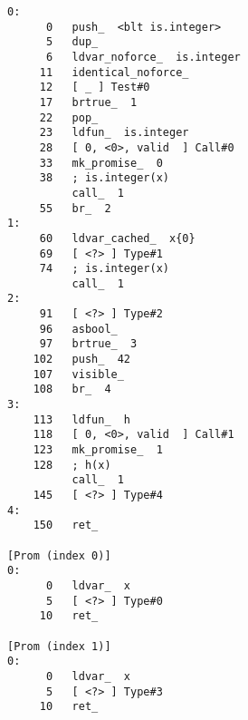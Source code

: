 \documentclass[varwidth=15cm, border={1cm 0.1cm 1cm 1cm}]{standalone}
\begin{document}
\begin{listing}
    \begin{verbatim}
0:
      0   push_  <blt is.integer>
      5   dup_
      6   ldvar_noforce_  is.integer
     11   identical_noforce_
     12   [ _ ] Test#0
     17   brtrue_  1
     22   pop_
     23   ldfun_  is.integer
     28   [ 0, <0>, valid  ] Call#0
     33   mk_promise_  0
     38   ; is.integer(x)
          call_  1
     55   br_  2
1:
     60   ldvar_cached_  x{0}
     69   [ <?> ] Type#1
     74   ; is.integer(x)
          call_  1
2:
     91   [ <?> ] Type#2
     96   asbool_
     97   brtrue_  3
    102   push_  42
    107   visible_
    108   br_  4
3:
    113   ldfun_  h
    118   [ 0, <0>, valid  ] Call#1
    123   mk_promise_  1
    128   ; h(x)
          call_  1
    145   [ <?> ] Type#4
4:
    150   ret_

[Prom (index 0)]
0:
      0   ldvar_  x
      5   [ <?> ] Type#0
     10   ret_

[Prom (index 1)]
0:
      0   ldvar_  x
      5   [ <?> ] Type#3
     10   ret_
    \end{verbatim}
\end{listing}
\end{document}
